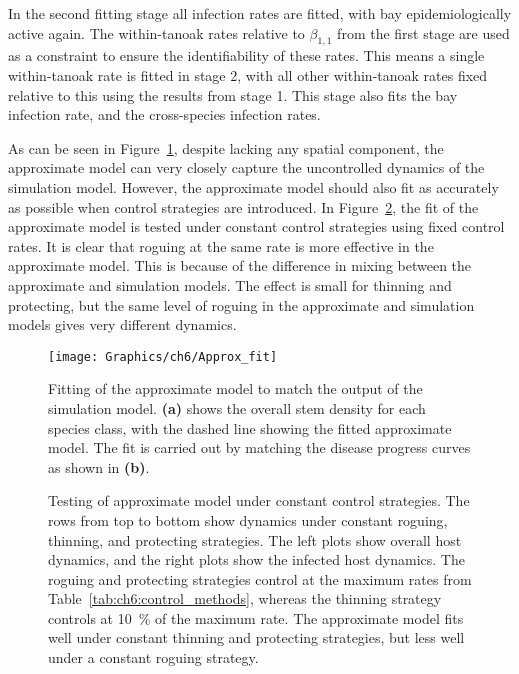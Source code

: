 In the second fitting stage all infection rates are fitted, with bay epidemiologically active again. The within-tanoak rates relative to $\beta_{1,1}$ from the first stage are used as a constraint to ensure the identifiability of these rates. This means a single within-tanoak rate is fitted in stage 2, with all other within-tanoak rates fixed relative to this using the results from stage 1. This stage also fits the bay infection rate, and the cross-species infection rates.

As can be seen in Figure~\ref{fig:ch6:approx_fit}, despite lacking any spatial component, the approximate model can very closely capture the uncontrolled dynamics of the simulation model. However, the approximate model should also fit as accurately as possible when control strategies are introduced. In Figure~\ref{fig:ch6:fit_under_control}, the fit of the approximate model is tested under constant control strategies using fixed control rates. It is clear that roguing at the same rate is more effective in the approximate model. This is because of the difference in mixing between the approximate and simulation models. The effect is small for thinning and protecting, but the same level of roguing in the approximate and simulation models gives very different dynamics.

\begin{figure}[t]
    \begin{center}
        \texttt{[image: Graphics/ch6/Approx\_fit]}
        \caption[Fitting of approximate model]{Fitting of the approximate model to match the output of the simulation model. \textbf{(a)} shows the overall stem density for each species class, with the dashed line showing the fitted approximate model. The fit is carried out by matching the disease progress curves as shown in \textbf{(b)}\label{fig:ch6:approx_fit}.}
    \end{center}
\end{figure}

\begin{figure}
    \begin{center}
        \caption[Testing of approximate model under control]{Testing of approximate model under constant control strategies. The rows from top to bottom show dynamics under constant roguing, thinning, and protecting strategies. The left plots show overall host dynamics, and the right plots show the infected host dynamics. The roguing and protecting strategies control at the maximum rates from Table~\ref{tab:ch6:control_methods}, whereas the thinning strategy controls at \SI{10}{\percent} of the maximum rate. The approximate model fits well under constant thinning and protecting strategies, but less well under a constant roguing strategy.\label{fig:ch6:fit_under_control}}
    \end{center}
\end{figure}

